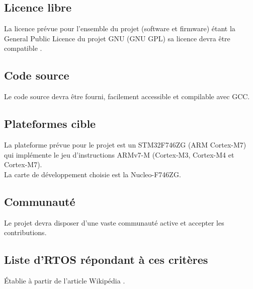 \subsection{Licence libre}
La licence prévue pour l'ensemble du projet (software et firmware) étant la 
General Public Licence du projet GNU (GNU GPL) sa licence devra être compatible
\cite{ref2}.

\subsection{Code source}
Le code source devra être fourni, facilement accessible et compilable avec GCC.

\subsection{Plateformes cible}
La plateforme prévue pour le projet est un STM32F746ZG (ARM Cortex-M7) qui implémente
le jeu d'instructions ARMv7-M (Cortex-M3, Cortex-M4 et Cortex-M7).\cite{ref3}\\

La carte de développement choisie est la Nucleo-F746ZG.

\subsection{Communauté}
Le projet devra disposer d'une vaste communauté active et accepter les contributions.

\subsection{Liste d'RTOS répondant à ces critères}
Établie à partir de l'article Wikipédia \cite{ref1}.



